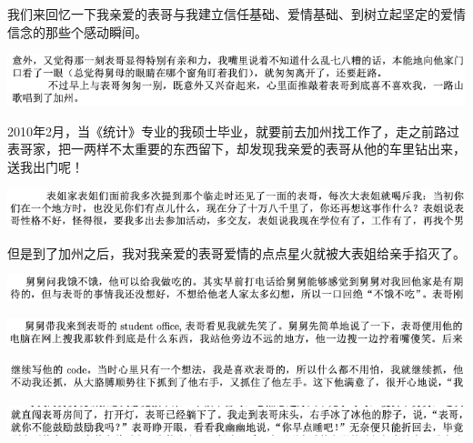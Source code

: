 \documentclass[9pt, b5paper]{article}
\begin{document}
我们来回忆一下我亲爱的表哥与我建立信任基础、爱情基础、到树立起坚定的爱情信念的那些个感动瞬间。 

\begin{center}
\includegraphics[width=.9\linewidth]{./pic/backups_plans_20210511_115910.png}
\end{center}

2010年2月，当《统计》专业的我硕士毕业，就要前去加州找工作了，走之前路过表哥家，把一两样不太重要的东西留下，却发现我亲爱的表哥从他的车里钻出来，送我出门呢！

\begin{center}
\includegraphics[width=.9\linewidth]{./pic/backups_plans_20210511_120022.png}
\end{center}

但是到了加州之后，我对我亲爱的表哥爱情的点点星火就被大表姐给亲手掐灭了。 

\begin{center}
\includegraphics[width=.9\linewidth]{./pic/backups_plans_20210511_120208.png}
\end{center}

\begin{center}
\includegraphics[width=.9\linewidth]{./pic/backups_plans_20210511_120306.png}
\end{center}

\begin{center}
\includegraphics[width=.9\linewidth]{./pic/backups_plans_20210511_120425.png}
\end{center}

\begin{center}
\includegraphics[width=.9\linewidth]{./pic/backups_plans_20210511_120500.png}
\end{center}
\end{document}
